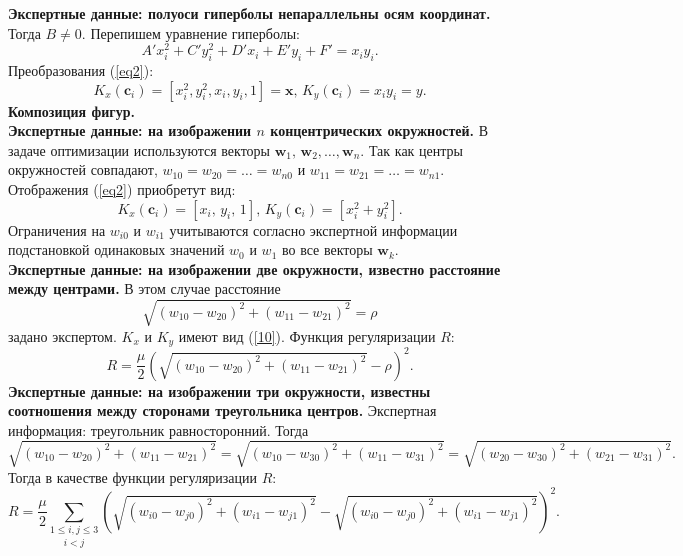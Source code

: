 \documentclass[12pt,twoside]{article}
\begin{document}
\textbf{Экспертные данные: полуоси гиперболы непараллельны осям координат.} 
Тогда $B \neq 0$. Перепишем уравнение гиперболы:\begin{equation}A'x_i^2 + C'y_i^2 + D'x_i + E'y_i + F' =  x_iy_i.\end{equation} Преобразования (\ref{eq2}): \begin{equation}
K_{x}(\mathbf{c}_i) = [x_i^2, y_i^2, x_i, y_i, 1] = \mathbf{x}, \,  K_{y}(\mathbf{c}_i) = x_iy_i = y.\end{equation} 
\textbf{Композиция фигур.}\\
\textbf{Экспертные данные: на изображении $n$ концентрических окружностей.} В задаче оптимизации используются векторы $\mathbf{w}_1, \, \mathbf{w}_2, \dots, \mathbf{w}_n$. Так как центры окружностей совпадают, $w_{10} = w_{20} = \dots = w_{n0}$ и $w_{11} = w_{21} = \dots =w_{n1} $. Отображения (\ref{eq2}) приобретут вид: \begin{equation}K_x(\mathbf{c}_i) = [x_i, \, y_i, \, 1], \, K_y(\mathbf{c}_i) = [x_i^2 + y_i^2].\end{equation} Ограничения на $w_{i0}$ и $w_{i1}$ учитываются согласно экспертной информации подстановкой одинаковых значений $w_0$ и $w_1$ во все векторы $\mathbf{w}_k$. \\
\textbf{Экспертные данные: на изображении две окружности, известно расстояние между центрами.}
В этом случае расстояние \begin{equation}\label{44}
\sqrt{({w}_{10}- {w}_{20})^2 + ({w}_{11} - {w}_{21})^2} = \rho\end{equation} задано экспертом. $K_x$ и $K_y$ имеют вид (\ref{10}). Функция регуляризации $R$: \begin{equation} \label{49}R =  \frac{\mu}{2}(\sqrt{({w}_{10}- {w}_{20})^2 + ({w}_{11} - {w}_{21})^2} - \rho)^2.\end{equation} 
\textbf{Экспертные данные: на изображении три окружности, известны соотношения между сторонами треугольника центров. }
Экспертная информация: треугольник равносторонний. Тогда \begin{equation}\sqrt{({w}_{10}- {w}_{20})^2 + ({w}_{11} - {w}_{21})^2} = \sqrt{({w}_{10}- {w}_{30})^2 + ({w}_{11} - {w}_{31})^2} = \sqrt{({w}_{20}- {w}_{30})^2 + ({w}_{21} - {w}_{31})^2}.\end{equation} Тогда в качестве функции регуляризации $R$: \begin{equation} \label{51} R =  \frac{\mu}{2}\underset{i < j}{\sum\limits_{1 \leq i, j \leq 3}}(\sqrt{({w}_{i0}- {w}_{j0})^2 + ({w}_{i1} - {w}_{j1})^2} - \sqrt{({w}_{i0}- {w}_{j0})^2 + ({w}_{i1} - {w}_{j1})^2})^2.\end{equation}
\end{document}
